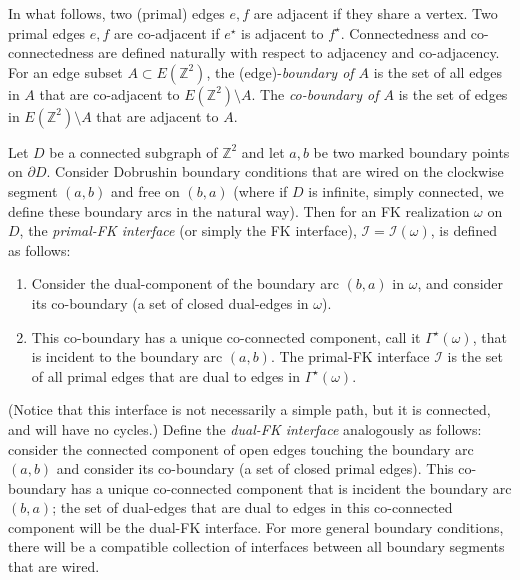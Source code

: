 \documentclass[reqno,11pt]{amsart}
\numberwithin{equation}{section}
\theoremstyle{definition}{
\newtheorem{example}[theorem]{Example}
\newtheorem{definition}[theorem]{Definition}
\newtheorem*{definition*}{Definition}
\newtheorem{problem}[theorem]{Problem}
\newtheorem{question}[theorem]{Question}
\newtheorem{remark}[theorem]{Remark}
}
\begin{document}
In what follows, two (primal) edges $e,f$ are adjacent if they share a vertex. Two primal edges $e,f$ are co-adjacent if $e^\star$ is adjacent to $f^\star$. Connectedness and co-connectedness are defined naturally with respect to adjacency and co-adjacency. %
For an edge subset $A\subset E(\mathbb Z^2)$, the (edge)-\emph{boundary of $A$} is the set of all edges in $A$ that are co-adjacent to $E(\mathbb Z^2) \setminus A$. The \emph{co-boundary of $A$} is the set of edges in $E(\mathbb Z^2)\setminus A$ that are adjacent to $A$.    

\begin{definition}\label{def:fk-interface}
Let $D$ be a connected subgraph of $\mathbb Z^2$ and let $a,b$ be two marked boundary points on $\partial D$. Consider Dobrushin boundary conditions that are wired on the clockwise segment $(a,b)$ and free on $(b,a)$ (where if $D$ is infinite, simply connected, we define these boundary arcs in the natural way). Then for an FK realization $\omega$ on $D$, the \emph{primal-FK interface} (or simply the FK interface), $\mathcal I= \mathcal I(\omega)$, is defined as follows: 
\begin{enumerate}
\item Consider the dual-component of the boundary arc $(b,a)$ in $\omega$, and consider its co-boundary (a set of closed dual-edges in $\omega$). 
\item This co-boundary has a unique co-connected component, call it $\Gamma^\star(\omega)$, that is incident to the boundary arc $(a,b)$. The primal-FK interface $\mathcal I$ is the set of all primal edges that are dual to edges in $\Gamma^\star (\omega)$.  
\end{enumerate}
(Notice that this interface is not necessarily a simple path, but it is connected, and will have no cycles.)
 Define the \emph{dual-FK interface} analogously as follows: consider the connected component of open edges touching the boundary arc $(a,b)$ and consider its co-boundary (a set of closed primal edges). This co-boundary has a unique co-connected component that is incident the boundary arc $(b,a)$; the set of dual-edges that are dual to edges in this co-connected component will be the dual-FK interface.  For more general boundary conditions, there will be a compatible collection of interfaces between all boundary segments that are wired.
\end{definition}
\end{document}
